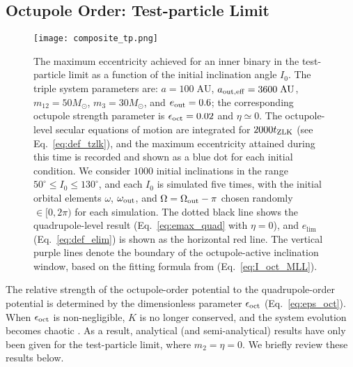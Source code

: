 \documentclass[
        fleqn,
        usenatbib,
    ]{mnras}
\begin{document}
\subsection{Octupole Order: Test-particle Limit}\label{ss:oct_tp}

\begin{figure}
    \centering
    \texttt{[image: composite\_tp.png]}
    \caption{The maximum eccentricity achieved for an inner binary in the
    test-particle limit as a function of the initial inclination angle $I_0$.
    The triple system parameters are: $a = 100\;\mathrm{AU}$, $a_{\rm out, eff}
    = 3600\;\mathrm{AU}$, $m_{12} = 50M_{\odot}$, $m_3 = 30M_{\odot}$, and
    $e_{\rm out} = 0.6$; the corresponding octupole strength parameter is
    $\epsilon_{\rm oct} = 0.02$ and $\eta \simeq 0$. The octupole-level secular
    equations of motion are integrated for $2000t_{\rm ZLK}$ (see
    Eq.~\ref{eq:def_tzlk}), and the maximum eccentricity attained during this
    time is recorded and shown as a blue dot for each initial condition. We
    consider $1000$ initial inclinations in the range $50^\circ \leq I_0 \leq
    130^\circ$, and each $I_0$ is simulated five times, with the initial orbital
    elements $\omega$, $\omega_{\rm out}$, and $\Omega = \Omega_{\rm out} - \pi$
    chosen randomly $\in [0, 2\pi)$ %
    for each simulation. The dotted black line shows the quadrupole-level result
    (Eq.~\ref{eq:emax_quad} with $\eta = 0$), and $e_{\lim}$
    (Eq.~\ref{eq:def_elim}) is shown as the horizontal red line. The vertical
    purple lines denote the boundary of the octupole-active inclination window,
    based on the fitting formula from \citet{MLL16} (Eq.~\ref{eq:I_oct_MLL}).
    }\label{fig:composite_tp}
\end{figure}

The relative strength of the octupole-order potential to the quadrupole-order
potential is determined by the dimensionless parameter $\epsilon_{\rm oct}$
(Eq.~\ref{eq:eps_oct}). When $\epsilon_{\rm oct}$ is non-negligible, $K$ is no
longer conserved, and the system evolution becomes chaotic
\citep{ford2000secular, katz2011long, lithwick2011eccentric, li2014chaos,
LML15}. As a result, analytical (and semi-analytical) results have only been
given for the test-particle limit, where $m_2 = \eta = 0$. We briefly review
these results below.
\end{document}
